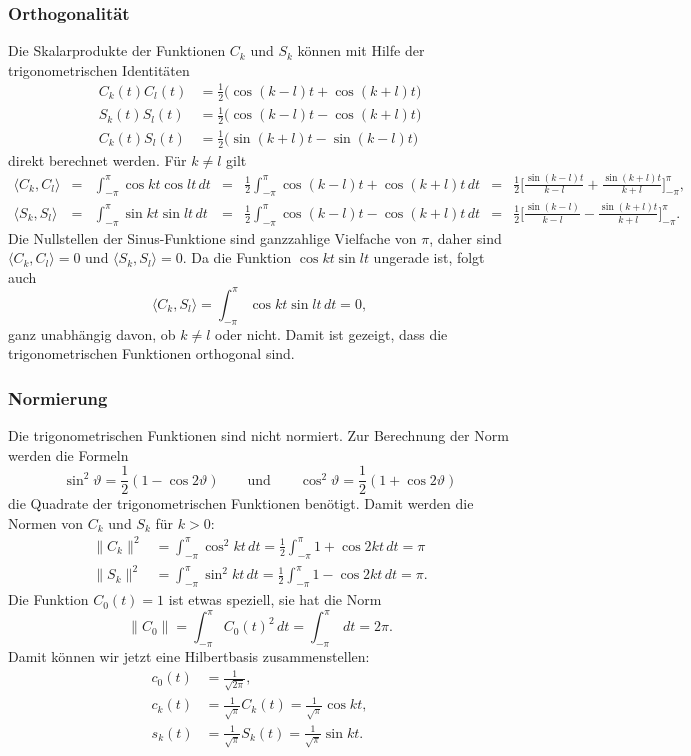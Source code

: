 \subsubsection{Orthogonalität}
Die Skalarprodukte der Funktionen $C_k$ und $S_k$ können mit Hilfe
der trigonometrischen Identitäten
\begin{align*}
C_k(t)C_l(t)
&=
\frac12\bigl(\cos(k-l)t+\cos(k+l)t\bigr)
\\
S_k(t)S_l(t)
&=
\frac12\bigl(\cos(k-l)t-\cos(k+l)t\bigr)
\\
C_k(t)S_l(t)
&=
\frac12\bigl(\sin(k+l)t-\sin(k-l)t\bigr)
\end{align*}
direkt berechnet werden.
Für $k\ne l$ gilt
\[
\renewcommand\arraycolsep{2pt}
\renewcommand\arraystretch{2.2}
\begin{array}{lclclcl}
\langle C_k,C_l\rangle
&=&
\displaystyle
\int_{-\pi}^\pi \cos kt\cos lt\,dt
&=&
\displaystyle
\frac12
\int_{-\pi}^\pi \cos(k-l)t+\cos(k+l)t\,dt
&=&
\displaystyle
\frac12\biggl[
\frac{\sin(k-l)t}{k-l} + \frac{\sin(k+l)t}{k+l}
\biggr]_{-\pi}^\pi,
\\
\langle S_k,S_l\rangle
&=&
\displaystyle
\int_{-\pi}^\pi \sin kt\sin lt\,dt
&=&
\displaystyle
\frac12
\int_{-\pi}^\pi \cos(k-l)t-\cos(k+l)t\,dt
&=&
\displaystyle
\frac12
\biggl[
\frac{\sin(k-l)}{k-l}-\frac{\sin(k+l)t}{k+l}
\biggr]_{-\pi}^\pi.
\end{array}
\]
Die Nullstellen der Sinus-Funktione sind ganzzahlige Vielfache von $\pi$,
daher sind $\langle C_k,C_l\rangle=0$ und $\langle S_k,S_l\rangle = 0$.
Da die Funktion $\cos kt \sin lt$ ungerade ist, folgt auch
\[
\langle C_k,S_l\rangle
=
\int_{-\pi}^\pi \cos kt\sin lt\,dt
=
0,
\]
ganz unabhängig davon, ob $k\ne l$ oder nicht.
Damit ist gezeigt, dass die trigonometrischen Funktionen orthogonal sind.

%
%
\subsubsection{Normierung}
Die trigonometrischen Funktionen sind nicht normiert.
Zur Berechnung der Norm werden die Formeln 
\[
\sin^2\vartheta = \frac12(1-\cos2\vartheta)
\qquad\text{und}\qquad
\cos^2\vartheta = \frac12(1+\cos2\vartheta)
\]
die Quadrate der trigonometrischen Funktionen benötigt.
Damit werden die Normen von $C_k$ und $S_k$ für $k>0$:
\begin{align*}
\|C_k\|^2
&=
\int_{-\pi}^\pi \cos^2kt\,dt
=
\frac12\int_{-\pi}^\pi 1+\cos 2kt\,dt
=
\pi
\\
\|S_k\|^2
&=
\int_{-\pi}^\pi \sin^2kt\,dt
=
\frac12\int_{-\pi}^\pi 1-\cos 2kt\,dt
=
\pi.
\end{align*}
Die Funktion $C_0(t)=1$ ist etwas speziell, sie hat die Norm
\[
\|C_0\|
=
\int_{-\pi}^\pi C_0(t)^2\,dt
=
\int_{-\pi}^\pi \,dt
=
2\pi.
\]
Damit können wir jetzt eine Hilbertbasis zusammenstellen:
\[
\begin{aligned}
c_0(t) &= \frac{1}{\sqrt{2\pi}},\\
c_k(t) &= \frac{1}{\sqrt{\pi}} C_k(t) = \frac{1}{\sqrt{\pi}} \cos kt,\\
s_k(t) &= \frac{1}{\sqrt{\pi}} S_k(t) = \frac{1}{\sqrt{\pi}} \sin kt.\\
\end{aligned}
\]

